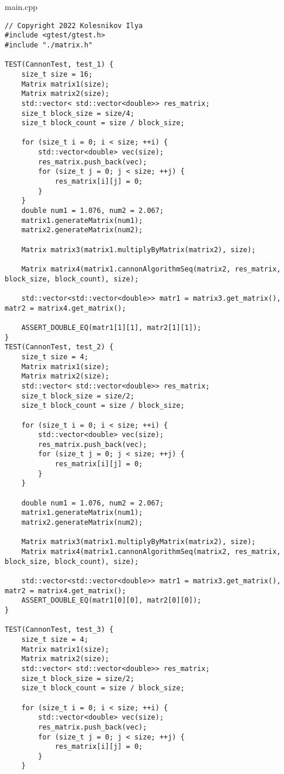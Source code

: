 \documentclass{report}
\begin{document}
main.cpp
\begin{lstlisting}
// Copyright 2022 Kolesnikov Ilya
#include <gtest/gtest.h>
#include "./matrix.h"

TEST(CannonTest, test_1) {
    size_t size = 16;
    Matrix matrix1(size);
    Matrix matrix2(size);
    std::vector< std::vector<double>> res_matrix;
    size_t block_size = size/4;
    size_t block_count = size / block_size;

    for (size_t i = 0; i < size; ++i) {
        std::vector<double> vec(size);
        res_matrix.push_back(vec);
        for (size_t j = 0; j < size; ++j) {
            res_matrix[i][j] = 0;
        }
    }
    double num1 = 1.076, num2 = 2.067;
    matrix1.generateMatrix(num1);
    matrix2.generateMatrix(num2);

    Matrix matrix3(matrix1.multiplyByMatrix(matrix2), size);

    Matrix matrix4(matrix1.cannonAlgorithmSeq(matrix2, res_matrix, block_size, block_count), size);

    std::vector<std::vector<double>> matr1 = matrix3.get_matrix(), matr2 = matrix4.get_matrix();

    ASSERT_DOUBLE_EQ(matr1[1][1], matr2[1][1]);
}
TEST(CannonTest, test_2) {
    size_t size = 4;
    Matrix matrix1(size);
    Matrix matrix2(size);
    std::vector< std::vector<double>> res_matrix;
    size_t block_size = size/2;
    size_t block_count = size / block_size;

    for (size_t i = 0; i < size; ++i) {
        std::vector<double> vec(size);
        res_matrix.push_back(vec);
        for (size_t j = 0; j < size; ++j) {
            res_matrix[i][j] = 0;
        }
    }

    double num1 = 1.076, num2 = 2.067;
    matrix1.generateMatrix(num1);
    matrix2.generateMatrix(num2);

    Matrix matrix3(matrix1.multiplyByMatrix(matrix2), size);
    Matrix matrix4(matrix1.cannonAlgorithmSeq(matrix2, res_matrix, block_size, block_count), size);

    std::vector<std::vector<double>> matr1 = matrix3.get_matrix(), matr2 = matrix4.get_matrix();
    ASSERT_DOUBLE_EQ(matr1[0][0], matr2[0][0]);
}

TEST(CannonTest, test_3) {
    size_t size = 4;
    Matrix matrix1(size);
    Matrix matrix2(size);
    std::vector< std::vector<double>> res_matrix;
    size_t block_size = size/2;
    size_t block_count = size / block_size;

    for (size_t i = 0; i < size; ++i) {
        std::vector<double> vec(size);
        res_matrix.push_back(vec);
        for (size_t j = 0; j < size; ++j) {
            res_matrix[i][j] = 0;
        }
    }


\end{lstlisting}
\end{document}
